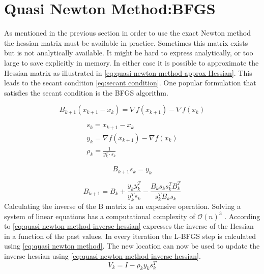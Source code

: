 	\section{Quasi Newton Method:BFGS}
	As mentioned in the previous section in order to use the exact Newton method the hessian matrix must be available in practice. Sometimes this matrix exists but is not analytically available. It might be hard to express analytically, or too large to save explicitly in memory. In either case it is possible to approximate the Hessian matrix as illustrated in \eqref{eq:quasi newton method approx Hessian}.  This leads to the secant condition \eqref{eq:secant condition}. One popular formulation that satisfies the secant condition is the BFGS algorithm.
		
		\begin{equation}
			B_{k+1}(x_{k+1}-x_k) = \nabla f(x_{k+1}) - \nabla f(x_k)
			\label{eq:quasi newton method approx Hessian}	
		\end{equation}
		
		\begin{eqnarray}
			s_k = x_{k+1} - x_{k} \\
			y_k = \nabla f(x_{k+1}) - \nabla f(x_{k}) \\
			\rho_k = \frac{1}{y_k^T \cdot s_k}
		\end{eqnarray}
	
		
		\begin{equation}
			B_{k+1} s_{k} = y_{k}
			\label{eq:secant condition}
		\end{equation}
		
		\begin{equation}
			B_{k+1} = B_{k} + \frac{y_k y_k^T}{ y_k^T s_k} - \frac{B_k s_k s_k^T B_k^T}{s_k^TB_ks_k}
			\label{eq:quasi newton method approx Hessian with past values}
		\end{equation}
	Calculating the inverse of the B matrix is an expensive operation. Solving a system of linear equations has a computational complexity of $\mathcal{O}(n)^3$ . According to \cite{Wright} \eqref{eq:quasi newton method inverse hessian} expresses the inverse of the Hessian in a function of the past values. In every iteration the L-BFGS step is calculated using \eqref{eq:quasi newton method}. The new location can now be used to update the inverse hessian using \eqref{eq:quasi newton method inverse hessian}.
		\begin{equation}
			V_k = I - \rho_ky_ks_k^T
		\end{equation}
	

